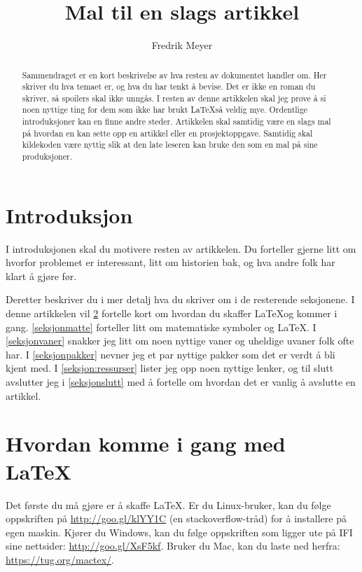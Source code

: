 \documentclass[a4paper, norsk]{article}  %
\title{Mal til en slags artikkel}
\author{Fredrik Meyer}
\begin{document}
\maketitle 

\begin{abstract}
\noindent
Sammendraget er en kort beskrivelse av hva resten av dokumentet handler om. Her skriver du hva temaet er, og hva du har tenkt å bevise. Det er ikke en roman du skriver, så spoilers skal ikke unngås. I resten av denne artikkelen skal jeg prøve å si noen nyttige ting for dem som ikke har brukt \LaTeX så veldig mye. Ordentlige introduksjoner kan en finne andre steder. Artikkelen skal samtidig være en slags mal på hvordan en kan sette opp en artikkel eller en prosjektoppgave. Samtidig skal kildekoden være nyttig slik at den late leseren kan bruke den som en mal på sine produksjoner.
\end{abstract}

\section{Introduksjon}

I introduksjonen skal du motivere resten av artikkelen. Du forteller gjerne litt om hvorfor problemet er interessant, litt om historien bak, og hva andre folk har klart å gjøre før.

Deretter beskriver du i mer detalj hva du skriver om i de resterende seksjonene. I denne artikkelen vil \cref{intro} fortelle kort om hvordan du skaffer \LaTeX og kommer i gang. \cref{seksjonmatte} forteller litt om matematiske symboler og \LaTeX. I \cref{seksjonvaner} snakker jeg litt om noen nyttige vaner og uheldige uvaner folk ofte har. I \cref{seksjonpakker} nevner jeg et par nyttige pakker som det er verdt å bli kjent med. I \cref{seksjon:ressurser} lister jeg opp noen nyttige lenker, og til slutt avslutter jeg i \cref{seksjonslutt} med å fortelle om hvordan det er vanlig å avslutte en artikkel.

\section{Hvordan komme i gang med \LaTeX}
\label{intro}

Det første du må gjøre er å skaffe \LaTeX. Er du Linux-bruker, kan du følge oppskriften på \url{http://goo.gl/klYY1C} (en stackoverflow-tråd) for å installere på egen maskin. Kjører du Windows, kan du følge oppskriften som ligger ute på IFI sine nettsider: \url{http://goo.gl/XsF5kf}. Bruker du Mac, kan du laste ned herfra: \url{https://tug.org/mactex/}.
\end{document}
